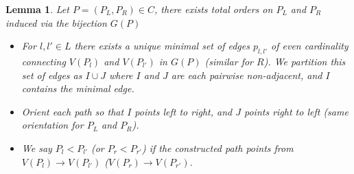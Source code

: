 \documentclass[11pt]{amsart}
\newtheorem{lemma}[thm]{Lemma}
\theoremstyle{definition}
\theoremstyle{remark}
\numberwithin{equation}{section}
\newcommand{\EC}{C}
\newcommand{\0}{\color{blue}{\mathsf{0}}}
\begin{document}
\begin{lemma} \label{Order Lemma}
Let $P=(P_L,P_R) \in \EC$, there exists total orders on $P_L$ and $P_R$ induced via the bijection $G(P)$
\begin{itemize}
    \item For $l,l' \in L$ there exists a unique minimal set of edges $p_{l,l'}$ of even cardinality connecting $V(P_l)$ and $V(P_{l'})$ in $G(P)$ (similar for $R$). We partition this set of edges as $I\cup J$ where $I$ and $J$ are each pairwise non-adjacent, and $I$ contains the minimal edge.
    \item Orient each path so that $I$ points left to right, and $J$ points right to left (same orientation for $P_L$ and $P_R$). 
    \item We say $P_l< P_{l'}$ (or $P_r < P_{r'}$) if the constructed path points from $V(P_l) \to V(P_{l'})$ ($V(P_r) \to V(P_{r'})$.
\end{itemize}
\end{lemma}
\end{document}
